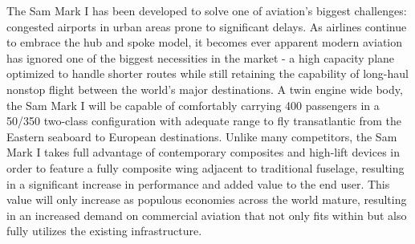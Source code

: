 The Sam Mark I has been developed to solve one of aviation's biggest challenges: congested airports in urban areas prone to significant delays.  As airlines continue to embrace the hub and spoke model, it becomes ever apparent modern aviation has ignored one of the biggest necessities in the market - a high capacity plane optimized to handle shorter routes while still retaining the capability of long-haul nonstop flight between the world's major destinations. A twin engine wide body, the Sam Mark I will be capable of comfortably carrying 400 passengers in a 50/350 two-class configuration with adequate range to fly transatlantic from the Eastern seaboard to European destinations.  Unlike many competitors, the Sam Mark I takes full advantage of contemporary composites and high-lift devices in order to feature a fully composite wing adjacent to traditional fuselage, resulting in a significant increase in performance and added value to the end user.  This value will only increase as populous economies across the world mature, resulting in an increased demand on commercial aviation that not only fits within but also fully utilizes the existing infrastructure. 


